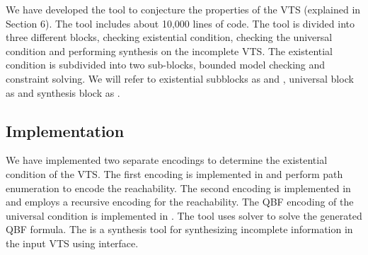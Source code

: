 %
%
\noindent We have developed the {\vtstool} tool to conjecture the properties of the VTS (explained in Section 6). 
%
%
The {\vtstool} tool includes about 10,000 lines of code.
%
The tool is divided into three different blocks,
%
checking existential condition, checking the universal condition and performing synthesis on the incomplete VTS. 
%
The existential condition is subdivided into two sub-blocks, bounded model checking and constraint solving. 
%
We will refer to existential subblocks as {\sattool} and {\smttool}, universal block as {\qbftool} and synthesis block as {\ourtool}.
%


\subsection{Implementation}
\noindent We have implemented two separate encodings to determine the existential condition of the VTS. 
%
The first encoding is implemented in {\sattool}
and perform path enumeration to encode the reachability. 
%
%
The second encoding is implemented in {\smttool} and employs a recursive encoding
for the reachability. 
%
%
%
The QBF encoding of the universal condition is implemented in {\qbftool}.
%
The tool uses {\depqbf} solver to solve the generated QBF formula. 
%
The {\ourtool} is a synthesis tool for synthesizing incomplete information in the input VTS using {\qbftool} interface.
%

